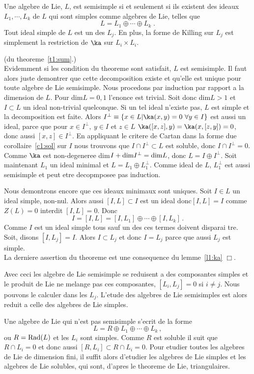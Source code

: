 \begin{ttt}\label{t1:sum}
Une algebre de Lie, $L$, est  semisimple si et seulement si ils existent des ideaux $L_1,\cdots, L_k$ de $L$ qui sont simples
comme algebres de Lie, telles que  
$$  L = L_1 \oplus \cdots \oplus L_k \;.$$ 
Tout ideal simple de $L$ est un des $L_j$. En plus, la forme de Killing sur $L_j$ est simplement 
la restriction de $\ka$ sur $L_i\times L_i$. 
\end{ttt}
\begin{prv}(du theoreme~\ref{t1:sum}.)\\
Evidemment si les condition du theoreme sont satisfait, $L$ est  semisimple. Il faut alors juste demontrer que 
cette decomposition existe et qu'elle est unique pour toute algebre de Lie  semisimple. Nous 
procedons par induction par rapport a la dimension de $L$. Pour dim$L =0,1$ l'enonce est trivial.
Soit donc dim$L>1$ et $I\subset L$ un ideal non-trivial quelconque. Si un tel ideal n'existe pas, $L$ est simple et 
la decomposition est faite. Alors
$I^{\perp} \equiv \{x\in L|\ka(x,y) =0 ~\forall y\in I\}$ est aussi un ideal, parce que pour $x\in I^{\perp},~ y\in I$ et $z\in L$
$\ka([x,z],y) =\ka(x,[z,y]) =0$, donc aussi $[x,z]\in  I^{\perp}$. En appliquant le critere de Cartan dans
la forme due corollaire~\ref{c1:sol} sur $I$ nous trouvons que $I\cap I^{\perp}\subset L$ est soluble, donc $I\cap I^{\perp} = 0$. Comme $\ka$ est non-degeneree
dim$I + {\rm dim} I^{\perp} = {\rm dim}L$, donc $L = I \oplus I^{\perp}$. 
Soit maintenant $L_1$ un ideal minimal et $L= L_1\oplus L_1^{\perp}$. Comme ideal de $L$, $L_1^{\perp}$ est
aussi  semisimple et peut etre decopmposee pas induction.

Nous demontrons encore que ces ideaux minimaux sont uniques. Soit $I\in L$ un ideal simple, non-nul. Alors aussi 
$[I,L]\subset I$ est un ideal donc$[I,L]=I$ comme $Z(L)=0$ interdit $[I,L]=0$. Donc
$$ I = [I,L] = [I,L_1]\oplus \cdots \oplus [I,L_k] \,. $$
Comme $I$ est un ideal simple tous sauf un des ces termes doivent disparai tre. Soit, disons $[I,L_j]=I$. 
Alors $I\subset L_j$ et donc $I=L_j$ parce que aussi $L_j$ est simple. \\
La derniere assertion du theoreme est une consequence du lemme~\ref{l1:ka} \hfill $\Box$.
\end{prv}
Avec ceci les algebre de Lie  semisimple se reduisent a des composantes simples et le produit de Lie 
ne melange pas ces composantes, $[L_i,L_j] = 0$ si $i\neq j$. Nous pouvons le calculer dans les $L_j$.
L'etude des algebres de Lie  semisimples est alors reduit a celle des  algebres de Lie simples.

Une algebre de Lie qui n'est pas  semisimple s'ecrit de la forme 
$$L=R \oplus L_1\oplus \cdots \oplus L_k \,,$$
ou $R={\rm Rad}(L)$ et les $L_i$ sont simples. Comme $R$ est soluble il suit que $R\cap L_i =0$ et donc aussi
$[R,L_i]\subset R\cap L_i =0$. Pour etudier toutes les algebres de Lie de dimension fini, il suffit alors d'etudier 
les algebres de Lie simples et les algebres de Lie solubles, qui sont, d'apres le theoreme de Lie, triangulaires.
